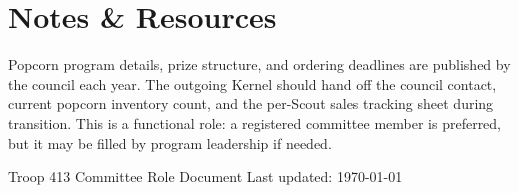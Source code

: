 \documentclass[11pt, letterpaper]{article}
\begin{document}
\vspace{0.6em}

\section{Notes \& Resources}
Popcorn program details, prize structure, and ordering deadlines are published by the council each year. The outgoing Kernel should hand off the council contact, current popcorn inventory count, and the per-Scout sales tracking sheet during transition. This is a functional role: a registered committee member is preferred, but it may be filled by program leadership if needed.

\vfill
\begin{center}
  \footnotesize\color{gray}
  Troop 413 \textbullet{} Committee Role Document \textbullet{} Last updated: \today
\end{center}
\end{document}

